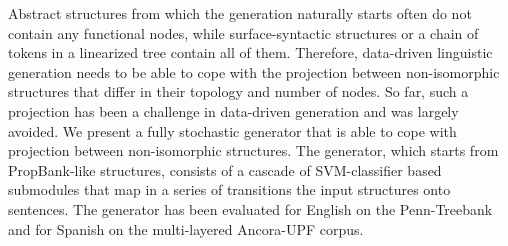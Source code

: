 Abstract structures from which the generation naturally starts often do not contain any functional nodes, while surface-syntactic structures or a chain of tokens in a linearized tree contain all of them.  Therefore, data-driven linguistic generation needs to be able to cope with the projection between non-isomorphic structures that differ in their topology and number of nodes. So far, such a projection has been a challenge in data-driven generation and was largely avoided. We present a fully stochastic generator that is able to cope with projection between non-isomorphic structures. The  generator, which starts from PropBank-like structures, consists of a cascade of SVM-classifier based submodules that map in a series of transitions the input structures onto sentences. The generator has been evaluated for English on the Penn-Treebank and for Spanish on the multi-layered Ancora-UPF corpus.
